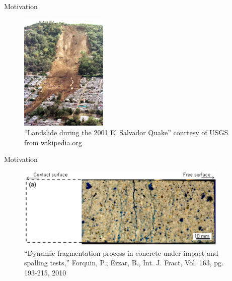 \documentclass[11pt]{beamer}
\begin{document}
\begin{frame}{Motivation}

\begin{figure}
\centering
\includegraphics[width = 0.37\textwidth]{./images/landslide.jpg}
\caption{“Landslide during the 2001 El Salvador Quake” courtesy of USGS from wikipedia.org }
\end{figure}

\end{frame}

\begin{frame}{Motivation}

\begin{figure}
\centering
\includegraphics[width = 0.9\textwidth]{./images/impact_spalling.png}
\caption{“Dynamic fragmentation process in concrete under impact and spalling tests,” Forquin, P.; Erzar, B., Int. J. Fract, Vol. 163, pg. 193-215, 2010}
\end{figure}

\end{frame}
\end{document}
